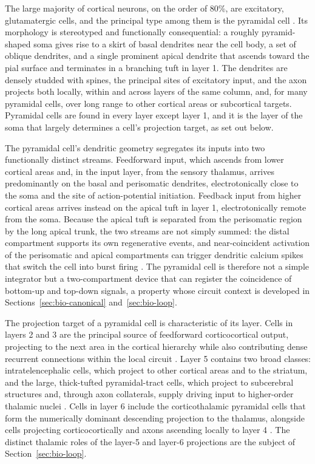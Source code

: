 The large majority of cortical neurons, on the order of 80\%, are excitatory, glutamatergic cells, and the principal type among them is 
the pyramidal cell \parencite{white1989, shepherd2018}. Its morphology is stereotyped and functionally consequential: a roughly 
pyramid-shaped soma gives rise to a skirt of basal dendrites near the cell body, a set of oblique dendrites, and a single prominent 
apical dendrite that ascends toward the pial surface and terminates in a branching tuft in layer 1. The dendrites are densely studded 
with spines, the principal sites of excitatory input, and the axon projects both locally, within and across layers of the same column, 
and, for many pyramidal cells, over long range to other cortical areas or subcortical targets. Pyramidal cells are found in every layer 
except layer 1, and it is the layer of the soma that largely determines a cell's projection target, as set out below.

The pyramidal cell's dendritic geometry segregates its inputs into two functionally distinct streams. Feedforward input, which ascends from lower cortical areas and, in the input layer, from the sensory thalamus, arrives predominantly on the basal and perisomatic dendrites, 
electrotonically close to the soma and the site of action-potential initiation. Feedback input from higher cortical areas arrives 
instead on the apical tuft in layer 1, electrotonically remote from the soma. Because the apical tuft is separated from the perisomatic 
region by the long apical trunk, the two streams are not simply summed: the distal compartment supports its own regenerative events, 
and near-coincident activation of the perisomatic and apical compartments can trigger dendritic calcium spikes that switch the cell 
into burst firing \parencite{larkum2013}. The pyramidal cell is therefore not a simple integrator but a two-compartment device that can
 register the coincidence of bottom-up and top-down signals, a property whose circuit context is developed in 
Sections~\ref{sec:bio-canonical} and~\ref{sec:bio-loop}.

The projection target of a pyramidal cell is characteristic of its layer. Cells in layers 2 and 3 are the principal source of 
feedforward corticocortical output, projecting to the next area in the cortical hierarchy while also contributing dense recurrent 
connections within the local circuit \parencite{douglas2004}. Layer 5 contains two broad classes: intratelencephalic cells, which 
project to other cortical areas and to the striatum, and the large, thick-tufted pyramidal-tract cells, which project to subcerebral 
structures and, through axon collaterals, supply driving input to higher-order thalamic nuclei \parencite{shepherd2018, sherman1998}. 
Cells in layer 6 include the corticothalamic pyramidal cells that form the numerically dominant descending projection to the thalamus, 
alongside cells projecting corticocortically and axons ascending locally to layer 4 \parencite{shepherd2018}. The distinct thalamic 
roles of the layer-5 and layer-6 projections are the subject of Section~\ref{sec:bio-loop}.

